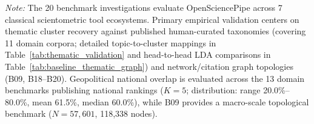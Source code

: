 \begin{table}[t]
\vspace{2pt}\par\raggedright\scriptsize\textit{Note:} The 20 benchmark investigations evaluate OpenSciencePipe across 7 classical scientometric tool ecosystems. Primary empirical validation centers on thematic cluster recovery against published human-curated taxonomies (covering 11 domain corpora; detailed topic-to-cluster mappings in Table~\ref{tab:thematic_validation} and head-to-head LDA comparisons in Table~\ref{tab:baseline_thematic_graph}) and network/citation graph topologies (B09, B18--B20). Geopolitical national overlap is evaluated across the 13 domain benchmarks publishing national rankings ($K=5$; distribution: range 20.0\%--80.0\%, mean 61.5\%, median 60.0\%), while B09 provides a macro-scale topological benchmark ($N=57{,}601$, 118,338 nodes).
\end{table}
